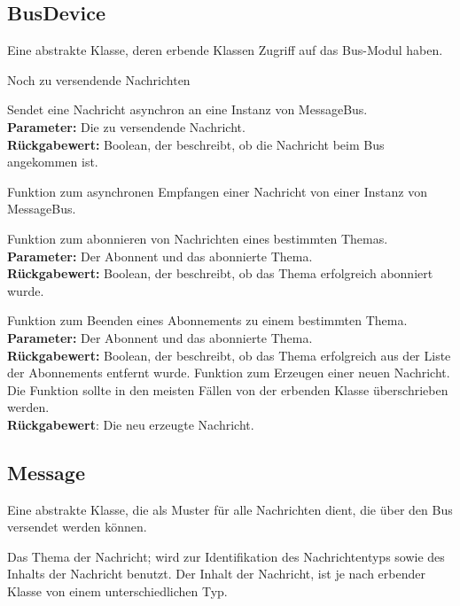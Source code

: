 \documentclass[entwurf.tex]{subfiles}
\begin{document}
	\subsection{BusDevice}
	\label{Class:BusDevice} 
		Eine abstrakte Klasse, deren erbende Klassen Zugriff auf das Bus-Modul haben.
		\begin{description}
				Noch zu versendende Nachrichten
			
				Sendet eine Nachricht asynchron an eine Instanz von MessageBus.\\ 
				\textbf{Parameter:} Die zu versendende Nachricht.\\ 
				\textbf{Rückgabewert:} Boolean, der beschreibt, ob die Nachricht beim Bus angekommen ist.
				
				Funktion zum asynchronen Empfangen einer Nachricht von einer Instanz von MessageBus.
				
				Funktion zum abonnieren von Nachrichten eines bestimmten Themas.\\ 
				\textbf{Parameter:} Der Abonnent und das abonnierte Thema.\\ 
				\textbf{Rückgabewert:} Boolean, der beschreibt, ob das Thema erfolgreich abonniert wurde.
				
				Funktion zum Beenden eines Abonnements zu einem bestimmten Thema.\\ 
				\textbf{Parameter:} Der Abonnent und das abonnierte Thema.\\ 
				\textbf{Rückgabewert:} Boolean, der beschreibt, ob das Thema erfolgreich aus der Liste der Abonnements entfernt wurde.
				Funktion zum Erzeugen einer neuen Nachricht. Die Funktion sollte in den meisten Fällen von der erbenden Klasse überschrieben werden. \\
				\textbf{Rückgabewert}: Die neu erzeugte Nachricht.
		\end{description}
  		
	\subsection{Message}
	\label{Class:Message} 
		Eine abstrakte Klasse, die als Muster für alle Nachrichten dient, die über den Bus versendet werden können.
		\begin{description}
			\attr{protected topic: Topic}  
				Das Thema der Nachricht; wird zur Identifikation des Nachrichtentyps sowie des Inhalts der Nachricht benutzt.
			\attr{Inhalt}
				Der Inhalt der Nachricht, ist je nach erbender Klasse von einem unterschiedlichen Typ.
		\end{description}
\end{document}
